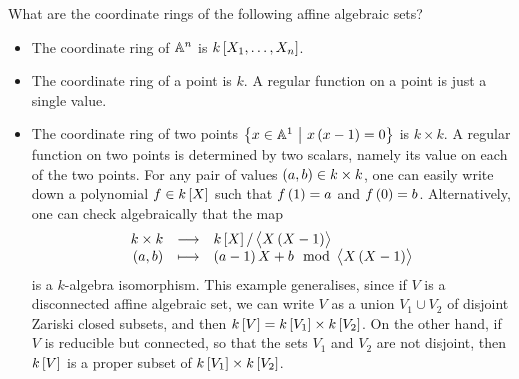 \begin{example*}
What are the coordinate rings of the following affine algebraic sets?
\begin{itemize}
\item The coordinate ring of $ \AA^n $ is $ k\sbr{X_1, \dots, X_n} $.
\item The coordinate ring of a point is $ k $. A regular function on a point is just a single value.
\item The coordinate ring of two points $ \cbr{x \in \AA^1 \st x\br{x - 1} = 0} $ is $ k \times k $. A regular function on two points is determined by two scalars, namely its value on each of the two points. For any pair of values $ \br{a, b} \in k \times k $, one can easily write down a polynomial $ f \in k\sbr{X} $ such that $ f\br{1} = a $ and $ f\br{0} = b $. Alternatively, one can check algebraically that the map
$$ \function{k \times k}{k\sbr{X} / \abr{X\br{X - 1}}}{\br{a, b}}{\br{a - 1}X + b \mod \abr{X\br{X - 1}}} $$
is a $ k $-algebra isomorphism. This example generalises, since if $ V $ is a disconnected affine algebraic set, we can write $ V $ as a union $ V_1 \cup V_2 $ of disjoint Zariski closed subsets, and then $ k\sbr{V} = k\sbr{V_1} \times k\sbr{V_2} $. On the other hand, if $ V $ is reducible but connected, so that the sets $ V_1 $ and $ V_2 $ are not disjoint, then $ k\sbr{V} $ is a proper subset of $ k\sbr{V_1} \times k\sbr{V_2} $.

\pagebreak


\end{itemize}
\end{example*}
